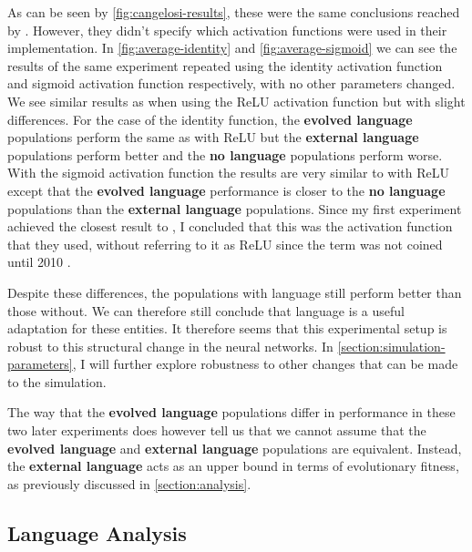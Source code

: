 \documentclass[12pt,a4paper]{report}
\begin{document}
As can be seen by \cref{fig:cangelosi-results}, these were the same conclusions reached by \citet{Cangelosi1998}. However, they didn't specify which activation functions were used in their implementation. In \cref{fig:average-identity} and \ref{fig:average-sigmoid} we can see the results of the same experiment repeated using the identity activation function and sigmoid activation function respectively, with no other parameters changed. We see similar results as when using the ReLU activation function but with slight differences. For the case of the identity function, the {\bf evolved language} populations perform the same as with ReLU but the {\bf external language} populations perform better and the {\bf no language} populations perform worse. With the sigmoid activation function the results are very similar to with ReLU except that the {\bf evolved language} performance is closer to the {\bf no language} populations than the {\bf external language} populations. Since my first experiment achieved the closest result to \citet{Cangelosi1998}, I concluded that this was the activation function that they used, without referring to it as ReLU since the term was not coined until 2010 \citep{nair2010rectified}.

Despite these differences, the populations with language still perform better than those without. We can therefore still conclude that language is a useful adaptation for these entities. It therefore seems that this experimental setup is robust to this structural change in the neural networks. In \cref{section:simulation-parameters}, I will further explore robustness to other changes that can be made to the simulation.

The way that the {\bf evolved language} populations differ in performance in these two later experiments does however tell us that we cannot assume that the {\bf evolved language} and {\bf external language} populations are equivalent. Instead, the {\bf external language} acts as an upper bound in terms of evolutionary fitness, as previously discussed in \cref{section:analysis}. %


\subsection{Language Analysis}\label{section:languageanalysis}
\end{document}
